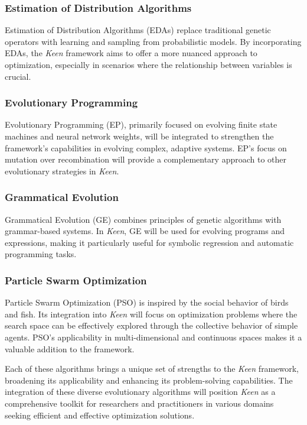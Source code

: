         \subsubsection{Estimation of Distribution Algorithms}
            Estimation of Distribution Algorithms (EDAs) replace traditional genetic operators with learning and 
            sampling from probabilistic models. By incorporating EDAs, the \textit{Keen} framework aims to offer a more 
            nuanced approach to optimization, especially in scenarios where the relationship between variables is 
            crucial.

        \subsubsection{Evolutionary Programming}
            Evolutionary Programming (EP), primarily focused on evolving finite state machines and neural network 
            weights, will be integrated to strengthen the framework's capabilities in evolving complex, adaptive 
            systems. EP's focus on mutation over recombination will provide a complementary approach to other 
            evolutionary strategies in \textit{Keen}.

        \subsubsection{Grammatical Evolution}
            Grammatical Evolution (GE) combines principles of genetic algorithms with grammar-based systems. In 
            \textit{Keen}, GE will be used for evolving programs and expressions, making it particularly useful for 
            symbolic regression and automatic programming tasks.

        \subsubsection{Particle Swarm Optimization}
            Particle Swarm Optimization (PSO) is inspired by the social behavior of birds and fish. Its integration into 
            \textit{Keen} will focus on optimization problems where the search space can be effectively explored through 
            the collective behavior of simple agents. PSO's applicability in multi-dimensional and continuous spaces 
            makes it a valuable addition to the framework.

        Each of these algorithms brings a unique set of strengths to the \textit{Keen} framework, broadening its 
        applicability and enhancing its problem-solving capabilities. The integration of these diverse evolutionary 
        algorithms will position \textit{Keen} as a comprehensive toolkit for researchers and practitioners in various 
        domains seeking efficient and effective optimization solutions.
